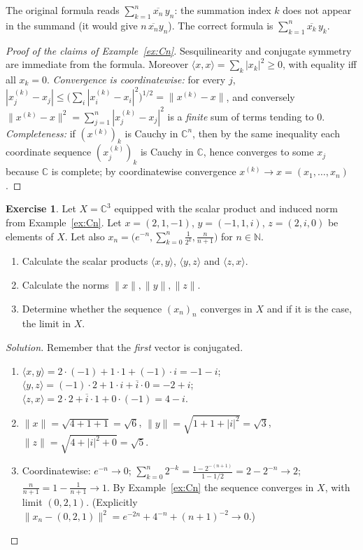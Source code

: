 \documentclass[11pt,a4paper]{article}
\numberwithin{equation}{section}
\newcommand{\N}{\mathbb{N}}
\newcommand{\C}{\mathbb{C}}
\newcommand{\ip}[2]{\langle #1, #2\rangle}
\newcommand{\conj}[1]{\overline{#1}}
\theoremstyle{plain}
\theoremstyle{definition}
\newtheorem{exercise}[theorem]{Exercise}
\theoremstyle{plain}
\theoremstyle{definition}
\newenvironment{solution}{\begin{proof}[Solution]}{\end{proof}}
\begin{document}
\begin{correction}[(Ex.~1.12)]
The original formula reads $\sum_{k=1}^n\conj{x_n}\,y_n$: the summation index $k$ does not
appear in the summand (it would give $n\,\conj{x_n}y_n$). The correct formula is
$\sum_{k=1}^n\conj{x_k}\,y_k$.
\end{correction}

\begin{proof}[Proof of the claims of Example~\ref{ex:Cn}]
Sesquilinearity and conjugate symmetry are immediate from the formula. Moreover
$\ip{x}{x}=\sum_k|x_k|^2\ge0$, with equality iff all $x_k=0$.
\emph{Convergence is coordinatewise:} for every $j$,
$|x_j^{(k)}-x_j|\le\big(\sum_i|x_i^{(k)}-x_i|^2\big)^{1/2}=\|x^{(k)}-x\|$, and conversely
$\|x^{(k)}-x\|^2=\sum_{j=1}^n|x_j^{(k)}-x_j|^2$ is a \emph{finite} sum of terms tending to $0$.
\emph{Completeness:} if $(x^{(k)})_k$ is Cauchy in $\C^n$, then by the same inequality each
coordinate sequence $(x^{(k)}_j)_k$ is Cauchy in $\C$, hence converges to some $x_j$
because $\C$ is complete; by coordinatewise convergence $x^{(k)}\to x=(x_1,\dots,x_n)$.
\end{proof}

\begin{exercise}
Let $X=\C^3$ equipped with the scalar product and induced norm from Example~\ref{ex:Cn}.
Let $x=(2,1,-1)$, $y=(-1,1,i)$, $z=(2,i,0)$ be elements of $X$. Let also
$x_n=\big(e^{-n},\sum_{k=0}^n\frac1{2^k},\frac{n}{n+1}\big)$ for $n\in\N$.
\begin{enumerate}
\item Calculate the scalar products $\ip{x}{y}$, $\ip{y}{z}$ and $\ip{z}{x}$.
\item Calculate the norms $\|x\|,\|y\|,\|z\|$.
\item Determine whether the sequence $(x_n)_n$ converges in $X$ and if it is the case, the limit in $X$.
\end{enumerate}
\end{exercise}
\begin{solution}
Remember that the \emph{first} vector is conjugated.
\begin{enumerate}
\item $\ip{x}{y}=2\cdot(-1)+1\cdot1+(-1)\cdot i=-1-i$;\quad
$\ip{y}{z}=(-1)\cdot2+1\cdot i+\conj{i}\cdot0=-2+i$;\quad
$\ip{z}{x}=2\cdot2+\conj{i}\cdot1+0\cdot(-1)=4-i$.
\item $\|x\|=\sqrt{4+1+1}=\sqrt6$, $\|y\|=\sqrt{1+1+|i|^2}=\sqrt3$, $\|z\|=\sqrt{4+|i|^2+0}=\sqrt5$.
\item Coordinatewise: $e^{-n}\to0$; $\sum_{k=0}^n2^{-k}=\frac{1-2^{-(n+1)}}{1-1/2}=2-2^{-n}\to2$;
$\frac n{n+1}=1-\frac1{n+1}\to1$. By Example~\ref{ex:Cn} the sequence converges in $X$, with
limit $(0,2,1)$. (Explicitly $\|x_n-(0,2,1)\|^2=e^{-2n}+4^{-n}+(n+1)^{-2}\to0$.)\qedhere
\end{enumerate}
\end{solution}
\end{document}
